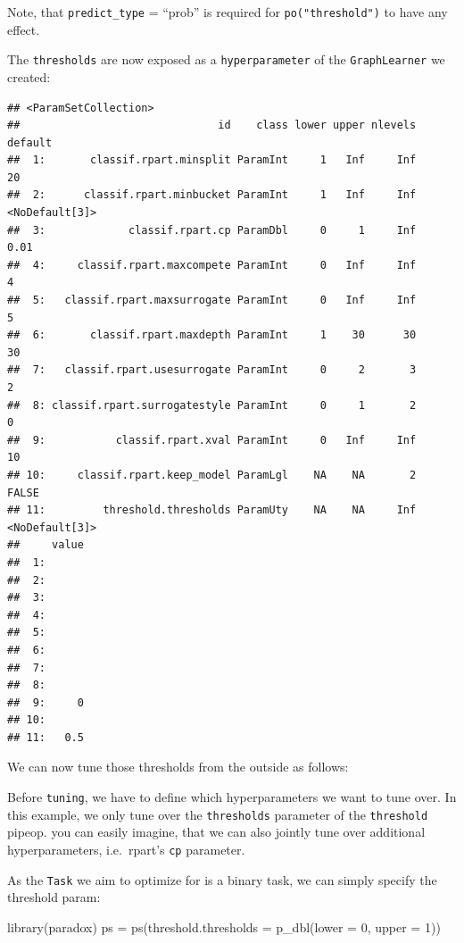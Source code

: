 \documentclass[
]{scrbook}
\newenvironment{Shaded}{\begin{snugshade}}{\end{snugshade}}
\newcommand{\AttributeTok}[1]{\textcolor[rgb]{0.77,0.63,0.00}{#1}}
\newcommand{\DecValTok}[1]{\textcolor[rgb]{0.00,0.00,0.81}{#1}}
\newcommand{\FunctionTok}[1]{\textcolor[rgb]{0.00,0.00,0.00}{#1}}
\newcommand{\NormalTok}[1]{#1}
\newcommand{\OtherTok}[1]{\textcolor[rgb]{0.56,0.35,0.01}{#1}}
\newcommand{\SpecialCharTok}[1]{\textcolor[rgb]{0.00,0.00,0.00}{#1}}
\renewenvironment{Shaded} {\begin{snugshade}\small} {\end{snugshade}}
\begin{document}
Note, that \texttt{predict\_type} = ``prob'' is required for \texttt{po("threshold")} to have any effect.

The \texttt{thresholds} are now exposed as a \texttt{hyperparameter} of the \texttt{GraphLearner} we created:

\begin{Shaded}
\end{Shaded}

\begin{verbatim}
## <ParamSetCollection>
##                               id    class lower upper nlevels        default
##  1:       classif.rpart.minsplit ParamInt     1   Inf     Inf             20
##  2:      classif.rpart.minbucket ParamInt     1   Inf     Inf <NoDefault[3]>
##  3:             classif.rpart.cp ParamDbl     0     1     Inf           0.01
##  4:     classif.rpart.maxcompete ParamInt     0   Inf     Inf              4
##  5:   classif.rpart.maxsurrogate ParamInt     0   Inf     Inf              5
##  6:       classif.rpart.maxdepth ParamInt     1    30      30             30
##  7:   classif.rpart.usesurrogate ParamInt     0     2       3              2
##  8: classif.rpart.surrogatestyle ParamInt     0     1       2              0
##  9:           classif.rpart.xval ParamInt     0   Inf     Inf             10
## 10:     classif.rpart.keep_model ParamLgl    NA    NA       2          FALSE
## 11:         threshold.thresholds ParamUty    NA    NA     Inf <NoDefault[3]>
##     value
##  1:      
##  2:      
##  3:      
##  4:      
##  5:      
##  6:      
##  7:      
##  8:      
##  9:     0
## 10:      
## 11:   0.5
\end{verbatim}

We can now tune those thresholds from the outside as follows:

Before \texttt{tuning}, we have to define which hyperparameters we want to tune over.
In this example, we only tune over the \texttt{thresholds} parameter of the \texttt{threshold} pipeop.
you can easily imagine, that we can also jointly tune over additional hyperparameters, i.e.~rpart's \texttt{cp} parameter.

As the \texttt{Task} we aim to optimize for is a binary task, we can simply specify the threshold param:

\begin{Shaded}
\begin{Highlighting}[]
\FunctionTok{library}\NormalTok{(paradox)}
\NormalTok{ps }\OtherTok{=} \FunctionTok{ps}\NormalTok{(}\AttributeTok{threshold.thresholds =} \FunctionTok{p\_dbl}\NormalTok{(}\AttributeTok{lower =} \DecValTok{0}\NormalTok{, }\AttributeTok{upper =} \DecValTok{1}\NormalTok{))}
\end{Highlighting}
\end{Shaded}
\end{document}
